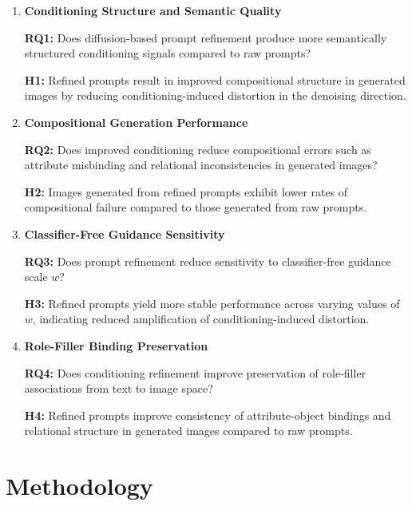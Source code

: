 \documentclass[a4paper,twoside,12pt]{report}
\begin{document}
\begin{enumerate}

\item \textbf{Conditioning Structure and Semantic Quality}

\textbf{RQ1:} Does diffusion-based prompt refinement produce more semantically structured conditioning signals compared to raw prompts?

\textbf{H1:} Refined prompts result in improved compositional structure in generated images by reducing conditioning-induced distortion in the denoising direction.

\item \textbf{Compositional Generation Performance}

\textbf{RQ2:} Does improved conditioning reduce compositional errors such as attribute misbinding and relational inconsistencies in generated images?

\textbf{H2:} Images generated from refined prompts exhibit lower rates of compositional failure compared to those generated from raw prompts.

\item \textbf{Classifier-Free Guidance Sensitivity}

\textbf{RQ3:} Does prompt refinement reduce sensitivity to classifier-free guidance scale \(w\)?

\textbf{H3:} Refined prompts yield more stable performance across varying values of \(w\), indicating reduced amplification of conditioning-induced distortion.

\item \textbf{Role-Filler Binding Preservation}

\textbf{RQ4:} Does conditioning refinement improve preservation of role-filler associations from text to image space?

\textbf{H4:} Refined prompts improve consistency of attribute-object bindings and relational structure in generated images compared to raw prompts.

\end{enumerate}


\section{Methodology}
\end{document}
